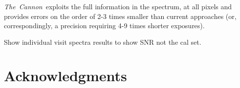 \documentclass[12pt, preprint]{aastex}
\newcommand{\project}[1]{\textsl{#1}}
\newcommand{\tc}{\project{The~Cannon}}
\newcommand{\apogee}{\project{\textsc{apogee}}}
\newcommand{\aspcap}{\project{\textsc{aspcap}}}
\newcommand{\teff}{\mbox{$\rm T_{eff}$}}
\newcommand{\feh}{\mbox{$\rm [Fe/H]$}}
\newcommand{\alphafe}{\mbox{$\rm [\alpha/Fe]$}}
\newcommand{\logg}{\mbox{$\rm \log g$}}
\begin{document}
\tc\ exploits the full information in the spectrum, at all pixels and provides errors on the order of 2-3 times smaller than current approaches (or, correspondingly, a precision requiring 4-9 times shorter exposures). %

Show individual visit spectra results to show SNR not the cal set. \\




\section*{Acknowledgments}
\end{document}

